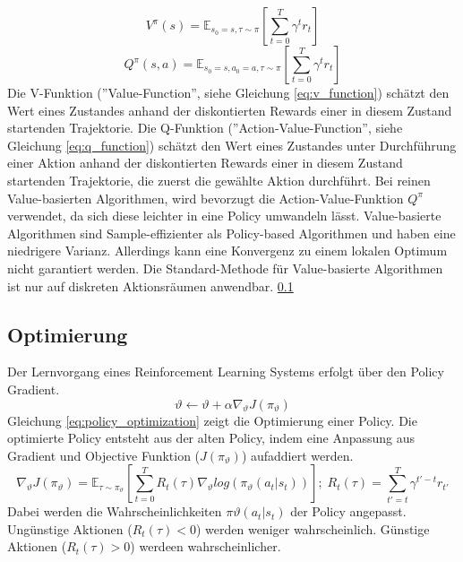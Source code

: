 \begin{equation}
    V^\pi (s)=\mathbb{E}_{s_0=s, \tau \sim \pi} \left[ \sum_{t=0}^T \gamma^t r_t \right]
    \label{eq:v_function}
\end{equation}
\begin{equation}
    Q^\pi (s,a) = \mathbb{E}_{s_0=s,a_0=a,\tau\sim\pi} \left[ \sum_{t=0}^T \gamma^t r_t\right]
    \label{eq:q_function}
\end{equation}
Die V-Funktion (''Value-Function'', siehe Gleichung \ref{eq:v_function}) schätzt den Wert eines Zustandes anhand der diskontierten Rewards einer in diesem Zustand startenden Trajektorie. 
Die Q-Funktion (''Action-Value-Function'', siehe Gleichung \ref{eq:q_function}) schätzt den Wert eines Zustandes unter Durchführung einer Aktion anhand der diskontierten Rewards einer in diesem Zustand startenden Trajektorie, die zuerst die gewählte Aktion durchführt. 
Bei reinen Value-basierten Algorithmen, wird bevorzugt die Action-Value-Funktion $Q^\pi$ verwendet, da sich diese leichter in eine Policy umwandeln lässt. 
Value-basierte Algorithmen sind Sample-effizienter als Policy-based Algorithmen und haben eine niedrigere Varianz. Allerdings kann eine Konvergenz zu einem lokalen Optimum nicht garantiert werden. Die Standard-Methode für Value-basierte Algorithmen ist nur auf diskreten Aktionsräumen anwendbar. \ref{}

\subsection{Optimierung}
Der Lernvorgang eines Reinforcement Learning Systems erfolgt über den Policy Gradient.
\begin{equation}
    \vartheta \leftarrow \vartheta + \alpha \nabla_\vartheta J(\pi_\vartheta)
    \label{eq:policy_optimization}
\end{equation}
Gleichung \ref{eq:policy_optimization} zeigt die Optimierung einer Policy. Die optimierte Policy entsteht aus der alten Policy, indem eine Anpassung aus Gradient und Objective Funktion ($J(\pi_\vartheta)$) aufaddiert werden.
\begin{equation}
    \nabla_\vartheta J(\pi_\vartheta) = \mathbb{E}_{\tau\sim\pi_\vartheta} \left[ \sum_{t=0}^T R_t(\tau) \nabla_\vartheta log(\pi_\vartheta(a_t\vert s_t))\right]
    ;\; R_t(\tau) = \sum_{t'=t}^T \gamma^{t'-t} r_{t'}
    \label{eq:gradient_objective_function}
\end{equation}
Dabei werden die Wahrscheinlichkeiten $\pi\vartheta(a_t\vert s_t)$ der Policy angepasst. Ungünstige Aktionen ($R_t(\tau) < 0$) werden weniger wahrscheinlich. Günstige Aktionen ($R_t(\tau) > 0$) werdeen wahrscheinlicher.

